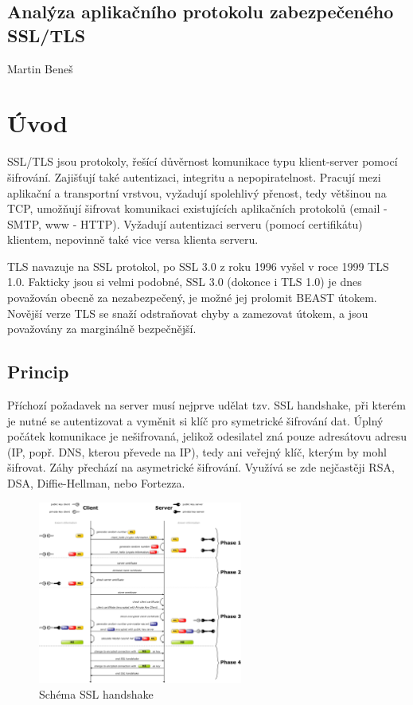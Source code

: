 \documentclass[10pt,a4paper,titlepage]{article}
\begin{document}

  \begin{center}
    \section*{Analýza aplikačního protokolu zabezpečeného SSL/TLS}
    Martin Beneš
  \end{center}

  \section*{Úvod}
  SSL/TLS jsou protokoly, řešící důvěrnost komunikace typu klient-server pomocí šifrování.
  Zajišťují také autentizaci, integritu a nepopiratelnost. Pracují mezi aplikační a
  transportní vrstvou, vyžadují spolehlivý přenost, tedy většinou na TCP, umožňují šifrovat
  komunikaci existujících aplikačních protokolů (email - SMTP, www - HTTP).
  Vyžadují autentizaci serveru (pomocí certifikátu) klientem, nepovinně také vice versa
  klienta serveru. \cite{DigiCert} \cite{RootSsl}

  TLS navazuje na SSL protokol, po SSL 3.0 z roku 1996 vyšel v roce 1999 TLS 1.0.
  Fakticky jsou si velmi podobné, SSL 3.0 (dokonce i TLS 1.0) je dnes považován obecně
  za nezabezpečený, je možné jej prolomit BEAST útokem. Novější verze TLS se snaží
  odstraňovat chyby a zamezovat útokem, a jsou považovány za marginálně bezpečnější.
  \cite{LuxSci}

  \subsection*{Princip}
  Příchozí požadavek na server musí nejprve udělat tzv. SSL handshake, při kterém je
  nutné se autentizovat a vyměnit si klíč pro symetrické šifrování dat. Úplný počátek
  komunikace je nešifrovaná, jelikož odesilatel zná pouze adresátovu adresu (IP, popř.
  DNS, kterou převede na IP), tedy ani veřejný klíč, kterým by mohl šifrovat.
  Záhy přechází na asymetrické šifrování. Využívá se zde nejčastěji RSA, DSA,
  Diffie-Hellman, nebo Fortezza.

  \begin{figure}[h!]
    \begin{center}
      \includegraphics[width=0.6\textwidth]{ssl.png}
      \caption{Schéma SSL handshake\label{fig:sslhandshake} \cite{WikiSSL}}
    \end{center}    
  \end{figure}
\end{document}
